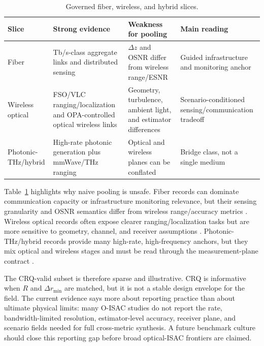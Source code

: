 \documentclass[letterpaper,journal]{IEEEtran}
\begin{document}
\begin{table}[!t]
    \caption{Governed fiber, wireless, and hybrid slices.}
    \label{tab:comparative_slices}
    \centering
    \scriptsize
    \setlength{\tabcolsep}{2.8pt}
    \renewcommand{\arraystretch}{1.08}
    \begin{tabularx}{\textwidth}{@{}p{1.7cm}p{2.0cm}p{2.1cm}X@{}}
        \toprule
        Slice & Strong evidence & Weakness for pooling & Main reading \\
        \midrule
        Fiber & Tb/s-class aggregate links and distributed sensing \cite{O_ISAC_046} & $\Delta z$ and OSNR differ from wireless range/ESNR & Guided infrastructure and monitoring anchor \\
        Wireless optical & FSO/VLC ranging/localization and OPA-controlled optical wireless links \cite{O_ISAC_023,O_ISAC_061} & Geometry, turbulence, ambient light, and estimator differences & Scenario-conditioned sensing/communication tradeoff \\
        Photonic-THz/hybrid & High-rate photonic generation plus mmWave/THz ranging \cite{O_ISAC_029,O_ISAC_105} & Optical and wireless planes can be conflated & Bridge class, not a single medium \\
        \bottomrule
    \end{tabularx}
\end{table}

Table~\ref{tab:comparative_slices} highlights why naive pooling is unsafe. Fiber records can dominate communication capacity or infrastructure monitoring relevance, but their sensing granularity and OSNR semantics differ from wireless range/accuracy metrics \cite{O_ISAC_038,O_ISAC_041,O_ISAC_046,O_ISAC_069,O_ISAC_074}. Wireless optical records often expose clearer ranging/localization tasks but are more sensitive to geometry, channel, and receiver assumptions \cite{O_ISAC_003,O_ISAC_005,O_ISAC_023,O_ISAC_035,O_ISAC_039,O_ISAC_048}. Photonic-THz/hybrid records provide many high-rate, high-frequency anchors, but they mix optical and wireless stages and must be read through the measurement-plane contract \cite{O_ISAC_026,O_ISAC_029,O_ISAC_047,O_ISAC_065,O_ISAC_077,O_ISAC_105}.

The CRQ-valid subset is therefore sparse and illustrative. CRQ is informative when \(R\) and \(\Delta r_{\min}\) are matched, but it is not a stable design envelope for the field. The current evidence says more about reporting practice than about ultimate physical limits: many O-ISAC studies do not report the rate, bandwidth-limited resolution, estimator-level accuracy, receiver plane, and scenario fields needed for full cross-metric synthesis. A future benchmark culture should close this reporting gap before broad optical-ISAC frontiers are claimed.
\end{document}
